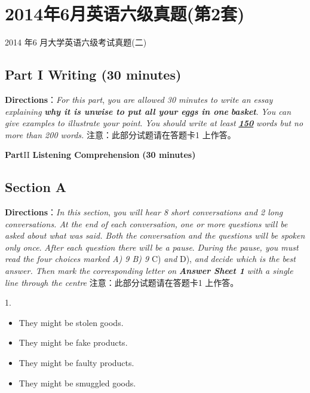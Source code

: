 \documentclass[UTF8,11pt]{ctexart}
\begin{document}
\section*{2014年6月英语六级真题(第2套)}
2014 年6 月大学英语六级考试真题(二)


\subsection*{\textbf{Part I} \textbf{Writing} \textbf{(30 minutes)}}


\textbf{Directions}：\textit{For this part},\textit{ you are allowed 30 minutes to write an essay explaining}\textbf{\textit{ why it is unwise to put all your eggs in one}} \textbf{\textit{basket}}.\textit{ You can give examples to illustrate your point}.\textit{ You should write at least}\textbf{\textit{ }}\textbf{\textit{\uline{150}}}\textit{ words but no more than 200 words.} 注意：此部分试题请在答题卡1 上作答。


\textbf{Part}II \textbf{Listening Comprehension} \textbf{(30 minutes)}


\subsection*{\textbf{Section A}}


\textbf{Directions}：\textit{In this section},\textit{ you will hear 8 short conversations and 2 long conversations. At the end of each conversation,} \textit{one or more questions will be asked about what was said. Both the conversation and the questions will be spoken only once}. \textit{After each question there will be a pause}.\textit{ During the pause, you must read the four choices marked A) 9 B) 9} C)\textit{ and} D),\textit{ and} \textit{decide which is the best answer. Then mark the} \textit{corresponding letter on}\textbf{\textit{ Answer Sheet 1}}\textit{ with a single line through the centre} 注意：此部分试题请在答题卡1 上作答。


1.


\begin{itemize}[leftmargin=2em,itemsep=.2em,topsep=.4em]\item[A.] They might be stolen goods.
\item[B.] They might be fake products.
\item[C.] They might be faulty products.
\item[D.] They might be smuggled goods.
\end{itemize}
\end{document}
